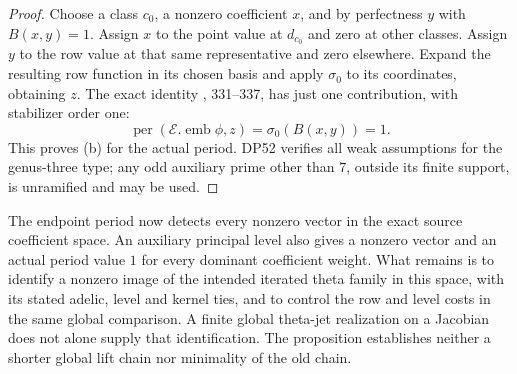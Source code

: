 \begin{proof}
Choose a class $c_0$, a nonzero coefficient $x$, and by perfectness
$y$ with $B(x,y)=1$.
Assign $x$ to the point value at $d_{c_0}$ and zero at other classes.
Assign $y$ to the row value at that same representative and zero elsewhere.
Expand the resulting row function in its chosen basis and apply
$\sigma_0$ to its coordinates, obtaining $z$.
The exact identity , 331--337, has just one
contribution, with stabilizer order one:
\[
 \operatorname{per}(\mathcal E.\operatorname{emb}\phi,z)
                    =\sigma_0(B(x,y))=1.
\]
This proves (b) for the actual period.
DP52 verifies all weak assumptions for the genus-three type;
any odd auxiliary prime other than $7$, outside its finite support,
is unramified and may be used.
\end{proof}

The endpoint period now detects every nonzero vector in the exact source
coefficient space. An auxiliary principal level also gives a nonzero
vector and an actual period value $1$ for every dominant coefficient weight.
What remains is to identify a nonzero image of the intended iterated theta
family in this space, with its stated adelic, level and kernel ties, and to
control the row and level costs in the same global comparison.
A finite global theta-jet realization on a Jacobian does not alone supply
that identification. The proposition establishes neither a shorter
global lift chain nor minimality of the old chain.
